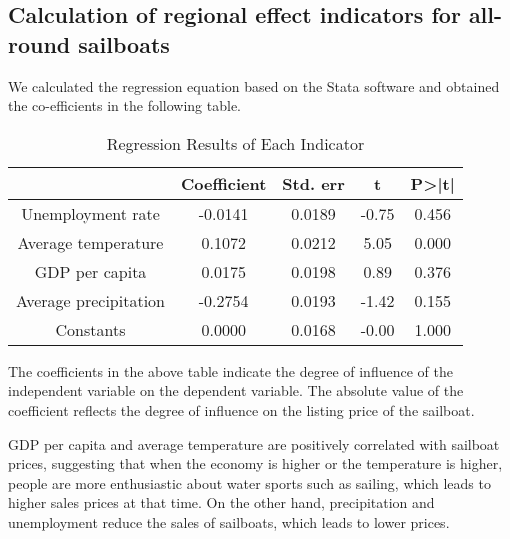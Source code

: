 \subsection{Calculation of regional effect indicators for all-round sailboats}

We calculated the regression equation based on the Stata software and obtained the co-efficients in the following table.	
\vspace{-0.5cm}
\begin{table}[H]
    \begin{center}
    \caption{Regression Results of Each Indicator}
    \resizebox{\textwidth}{!}
    {\begin{tabular}{c c c c c}
    \toprule[2pt]
    \multicolumn{1}{m{5cm}}{\centering \textbf{}} %
    &\multicolumn{1}{m{3cm}}{\centering \textbf{Coefficient}}
    &\multicolumn{1}{m{3cm}}{\centering \textbf{Std. err}}
    &\multicolumn{1}{m{2.5cm}}{\centering \textbf{t}}
    &\multicolumn{1}{m{2.5cm}}{\centering \textbf{P>|t|}}\\
    \midrule
    Unemployment rate   & -0.0141 & 0.0189 & -0.75 & 0.456 \\
    Average temperature & 0.1072  & 0.0212 & 5.05 & 0.000\\
    GDP per capita   & 0.0175 & 0.0198 & 0.89 & 0.376\\
    Average precipitation & -0.2754   & 0.0193 & -1.42 & 0.155\\
    Constants & 0.0000 & 0.0168 & -0.00 & 1.000\\
    \bottomrule[2pt]
    \end{tabular}}
    \end{center}
\end{table}
\vspace{-0.5cm}

The coefficients in the above table indicate the degree of influence of the independent variable on the dependent variable. The absolute value of the coefficient reflects the degree of influence on the listing price of the sailboat.

GDP per capita and average temperature are positively correlated with sailboat prices, suggesting that when the economy is higher or the temperature is higher, people are more enthusiastic about water sports such as sailing, which leads to higher sales prices at that time. On the other hand, precipitation and unemployment reduce the sales of sailboats, which leads to lower prices.

